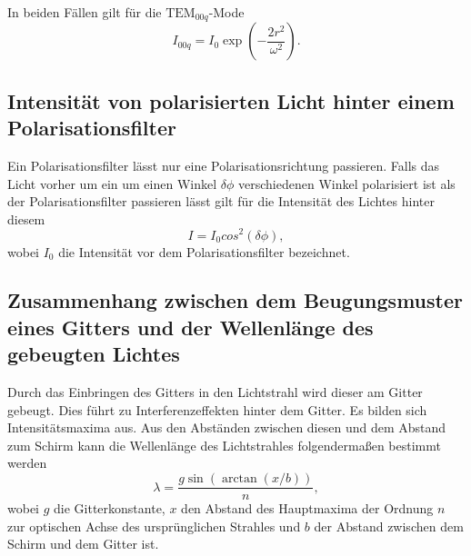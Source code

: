 In beiden Fällen gilt für die $\text{TEM}_{00q}$-Mode
\begin{equation}
I_{00q} = I_0 \exp\left(-\frac{2 r^2}{\omega ^2}\right). \label{eq:gaus}
\end{equation}

\subsection{Intensität von polarisierten Licht hinter einem Polarisationsfilter}
Ein Polarisationsfilter lässt nur eine Polarisationsrichtung passieren. Falls das Licht vorher um ein um einen Winkel $\delta\phi$ verschiedenen Winkel polarisiert ist als der Polarisationsfilter passieren lässt gilt für die Intensität des Lichtes hinter diesem
\begin{equation}
	I=I_0 cos^2(\delta\phi), \label{eq:polar}
\end{equation}
wobei $I_0$ die Intensität vor dem Polarisationsfilter bezeichnet.

\subsection{Zusammenhang zwischen dem Beugungsmuster eines Gitters und der Wellenlänge des gebeugten Lichtes}
Durch das Einbringen des Gitters in den Lichtstrahl wird dieser am Gitter gebeugt. Dies führt zu Interferenzeffekten hinter dem Gitter. Es bilden sich Intensitätsmaxima aus. Aus den Abständen zwischen diesen und dem Abstand zum Schirm kann die Wellenlänge des Lichtstrahles folgendermaßen bestimmt werden
\begin{equation}
	\lambda = \frac{g \sin(\arctan(x/b))}{n}, \label{eq:lambda}
\end{equation}
wobei $g$ die Gitterkonstante, $x$ den Abstand des Hauptmaxima der Ordnung $n$ zur optischen Achse des ursprünglichen Strahles und $b$ der Abstand zwischen dem Schirm und dem Gitter ist.



